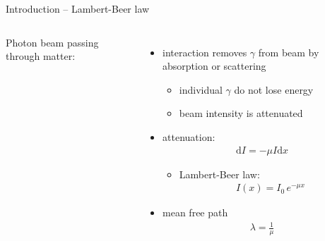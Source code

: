 \documentclass[11pt,xcolor=dvipsnames,professionalfonts,notes]{beamer}
\begin{document}
\begin{frame}{Introduction -- Lambert-Beer law}
	\begin{columns}
		Photon beam passing through matter:
			\begin{itemize}
				\item interaction removes $\gamma$ from beam by absorption or scattering
				\begin{itemize}
					\item individual $\gamma$ do not lose energy
					\item beam intensity is attenuated
				\end{itemize}
				
				\item attenuation:
				\begin{align*}
					\mathrm{d} I = - \mu I \mathrm{d}x
				\end{align*}
				\begin{itemize}
					\item Lambert-Beer law:
					\begin{align*}
					I(x) = I_0 \, e^{-\mu x}
					\end{align*}
				\end{itemize}
				
				
				\item mean free path
				\begin{align*}
					\lambda = \frac{1}{\mu}
				\end{align*}
			\end{itemize}


\end{columns}
\end{frame}
\end{document}
